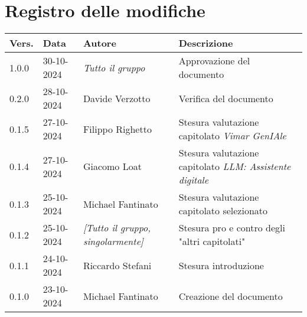 \section*{Registro delle modifiche}

\begin{table}[h]
    \centering
    \begin{tabular}{|l|l|p{3cm}|p{5cm}|}
        \hline
        \rowcolor[gray]{0.9}
        \textbf{Vers.} & \textbf{Data} & \textbf{Autore} & \textbf{Descrizione}\\
        \hline
        1.0.0 & 30-10-2024 & \emph{Tutto il gruppo} & Approvazione del documento\\
        \hline
        0.2.0 & 28-10-2024 & Davide Verzotto & Verifica del documento\\
        \hline
        0.1.5 & 27-10-2024 & Filippo Righetto & Stesura valutazione capitolato \emph{Vimar GenIAle}\\
        \hline
        0.1.4 & 27-10-2024 & Giacomo Loat & Stesura valutazione capitolato \emph{LLM: Assistente digitale}\\
        \hline
        0.1.3 & 25-10-2024 & Michael Fantinato & Stesura valutazione capitolato selezionato\\
        \hline
        0.1.2 & 25-10-2024 & \emph{[Tutto il gruppo, singolarmente]} & Stesura pro e contro degli "altri capitolati"\\
        \hline
        0.1.1 & 24-10-2024 & Riccardo Stefani & Stesura introduzione\\
        \hline
        0.1.0 & 23-10-2024 & Michael Fantinato & Creazione del documento\\
        \hline
    \end{tabular}
\end{table}
